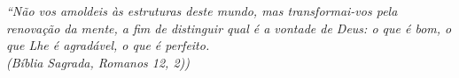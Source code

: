 \documentclass[
	12pt,				%
	openright,			%
	oneside,			%
	a4paper,			%
	tccpreliminar,			%
	]{ABNT-DC-UEL}
\begin{document}
\begin{agradecimentos}


\end{agradecimentos}

\begin{epigrafe}
  \vspace*{\fill}
  \hspace{.4\textwidth}
  \begin{minipage}{.5\textwidth}   
    \begin{flushright}
	\textit{
    ``Não vos amoldeis às estruturas deste mundo,
      mas transformai-vos pela renovação da mente,
      a fim de distinguir qual é a vontade de Deus:
      o que é bom, o que Lhe é agradável, o que é perfeito.\\
      (Bíblia Sagrada, Romanos 12, 2))}
    \end{flushright}
  \end{minipage}
\end{epigrafe}

\end{document}
